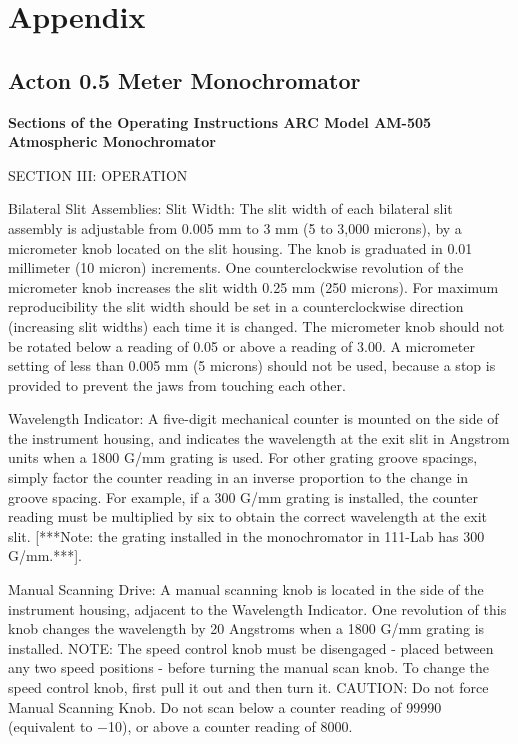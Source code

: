 \documentclass{../lab}
\begin{document}
\section{Appendix}
\label{sec:Appendix}

\subsection{Acton 0.5 Meter Monochromator}

\textbf{Sections of the Operating Instructions ARC Model AM-505 Atmospheric Monochromator}

SECTION III: OPERATION

Bilateral Slit Assemblies: Slit Width: The slit width of each bilateral slit assembly is adjustable from 0.005 mm to 3 mm (5 to 3,000 microns), by a micrometer knob located on the slit housing. The knob is graduated in 0.01 millimeter (10 micron) increments. One counterclockwise revolution of the micrometer knob increases the slit width 0.25 mm (250 microns). For maximum reproducibility the slit width should be set in a counterclockwise direction (increasing slit widths) each time it is changed. The micrometer knob should not be rotated below a reading of 0.05 or above a reading of 3.00. A micrometer setting of less than 0.005 mm (5 microns) should not be used, because a stop is provided to prevent the jaws from touching each other.

Wavelength Indicator: A five-digit mechanical counter is mounted on the side of the instrument housing, and indicates the wavelength at the exit slit in Angstrom units when a 1800 G/mm grating is used. For other grating groove spacings, simply factor the counter reading in an inverse proportion to the change in groove spacing. For example, if a 300 G/mm grating is installed, the counter reading must be multiplied by six to obtain the correct wavelength at the exit slit. [***Note: the grating installed in the monochromator in 111-Lab has 300 G/mm.***].

Manual Scanning Drive: A manual scanning knob is located in the side of the instrument housing, adjacent to the Wavelength Indicator. One revolution of this knob changes the wavelength by 20 Angstroms when a 1800 G/mm grating is installed. NOTE: The speed control knob must be disengaged - placed between any two speed positions - before turning the manual scan knob. To change the speed control knob, first pull it out and then turn it. CAUTION: Do not force Manual Scanning Knob. Do not scan below a counter reading of 99990 (equivalent to $-$10), or above a counter reading of 8000.
\end{document}

